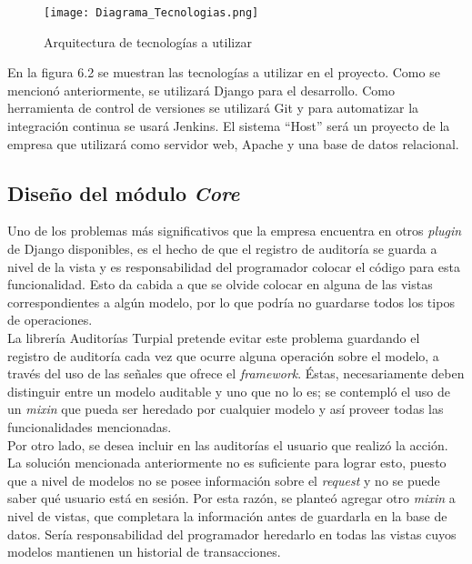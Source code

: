 \begin{figure}
\centering
\texttt{[image: Diagrama\_Tecnologias.png]}
\caption{Arquitectura de tecnologías a utilizar}
\label{fig:figure6.2}
\end{figure}

En la figura 6.2 se muestran las tecnologías a utilizar en el proyecto. Como se mencionó anteriormente, se utilizará Django para el desarrollo. Como herramienta de control de versiones se utilizará Git y para automatizar la integración continua se usará Jenkins. El sistema “Host” será un proyecto de la empresa que utilizará como servidor web, Apache y una base de datos relacional.

\subsection{Diseño del módulo \textit{Core}}

Uno de los problemas más significativos que la empresa encuentra en otros \textit{plugin} de Django disponibles, es el hecho de que el registro de auditoría se guarda a nivel de la vista y es responsabilidad del programador colocar el código para esta funcionalidad. Esto da cabida a que se olvide colocar en alguna de las vistas correspondientes a algún modelo, por lo que podría no guardarse todos los tipos de operaciones. \\

La librería Auditorías Turpial pretende evitar este problema guardando el registro de auditoría cada vez que ocurre alguna operación sobre el modelo, a través del uso de las señales que ofrece el \textit{framework}. Éstas, necesariamente deben distinguir entre un modelo auditable y uno que no lo es; se contempló el uso de un \textit{mixin} que pueda ser heredado por cualquier modelo y así proveer todas las funcionalidades mencionadas. \\

Por otro lado, se desea incluir en las auditorías el usuario que realizó la acción. La solución mencionada anteriormente no es suficiente para lograr esto, puesto que a nivel de modelos no se posee información sobre el \textit{request} y no se puede saber qué usuario está en sesión. Por esta razón, se planteó agregar otro \textit{mixin} a nivel de vistas, que completara la información antes de guardarla en la base de datos. Sería responsabilidad del programador heredarlo en todas las vistas cuyos modelos mantienen un historial de transacciones.\\

